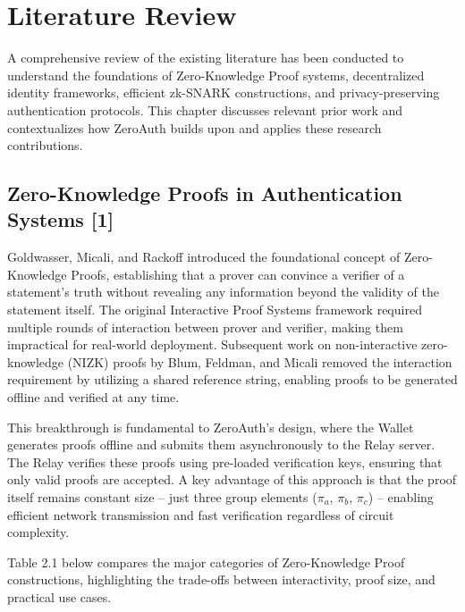 \chapter{Literature Review}

A comprehensive review of the existing literature has been conducted to understand the foundations of Zero-Knowledge Proof systems, decentralized identity frameworks, efficient zk-SNARK constructions, and privacy-preserving authentication protocols. This chapter discusses relevant prior work and contextualizes how ZeroAuth builds upon and applies these research contributions.

\section{Zero-Knowledge Proofs in Authentication Systems [1]}

Goldwasser, Micali, and Rackoff introduced the foundational concept of Zero-Knowledge Proofs, establishing that a prover can convince a verifier of a statement's truth without revealing any information beyond the validity of the statement itself. The original Interactive Proof Systems framework required multiple rounds of interaction between prover and verifier, making them impractical for real-world deployment. Subsequent work on non-interactive zero-knowledge (NIZK) proofs by Blum, Feldman, and Micali removed the interaction requirement by utilizing a shared reference string, enabling proofs to be generated offline and verified at any time.

This breakthrough is fundamental to ZeroAuth's design, where the Wallet generates proofs offline and submits them asynchronously to the Relay server. The Relay verifies these proofs using pre-loaded verification keys, ensuring that only valid proofs are accepted. A key advantage of this approach is that the proof itself remains constant size -- just three group elements ($\pi_a$, $\pi_b$, $\pi_c$) -- enabling efficient network transmission and fast verification regardless of circuit complexity.

Table 2.1 below compares the major categories of Zero-Knowledge Proof constructions, highlighting the trade-offs between interactivity, proof size, and practical use cases.

